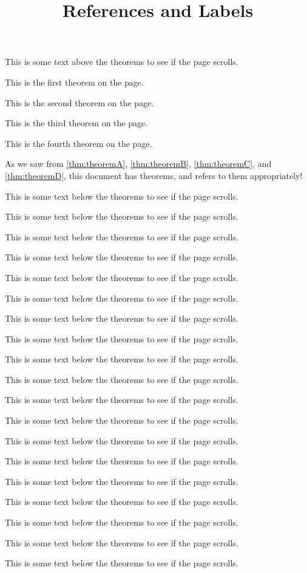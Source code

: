 \documentclass{ximera}
\begin{document}
\title{References and Labels}

This is some text above the theorems to see if the page scrolls.

\begin{theorem}
\label{thm:theoremA} This is the first theorem on the page.
\end{theorem}

\begin{theorem}
\label{thm:theoremB} This is the second theorem on the page.
\end{theorem}

\begin{lemma}
\label{thm:theoremC} This is the third theorem on the page.
\end{lemma}

\begin{definition}
\label{thm:theoremD} This is the fourth theorem on the page.
\end{definition}

As we saw from \autoref{thm:theoremA}, \autoref{thm:theoremB}, \autoref{thm:theoremC}, and \autoref{thm:theoremD}, this document has theorems, and refers to them appropriately!

This is some text below the theorems to see if the page scrolls.

This is some text below the theorems to see if the page scrolls.

This is some text below the theorems to see if the page scrolls.

This is some text below the theorems to see if the page scrolls.

This is some text below the theorems to see if the page scrolls.

This is some text below the theorems to see if the page scrolls.

This is some text below the theorems to see if the page scrolls.

This is some text below the theorems to see if the page scrolls.

This is some text below the theorems to see if the page scrolls.

This is some text below the theorems to see if the page scrolls.

This is some text below the theorems to see if the page scrolls.

This is some text below the theorems to see if the page scrolls.

This is some text below the theorems to see if the page scrolls.

This is some text below the theorems to see if the page scrolls.

This is some text below the theorems to see if the page scrolls.

This is some text below the theorems to see if the page scrolls.

This is some text below the theorems to see if the page scrolls.

This is some text below the theorems to see if the page scrolls.

This is some text below the theorems to see if the page scrolls.
\end{document}
